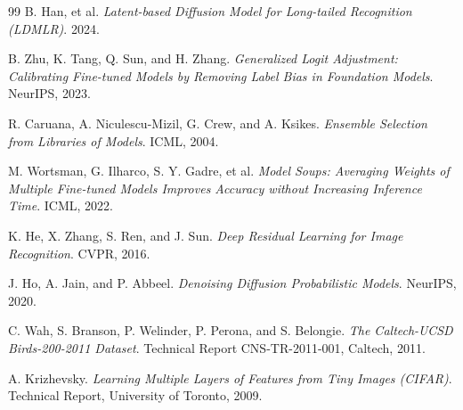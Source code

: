 \begin{thebibliography}{99}
B. Han, et al.
\textit{Latent-based Diffusion Model for Long-tailed Recognition (LDMLR)}.
2024.

B. Zhu, K. Tang, Q. Sun, and H. Zhang.
\textit{Generalized Logit Adjustment: Calibrating Fine-tuned Models by Removing Label Bias in Foundation Models}.
NeurIPS, 2023.

R. Caruana, A. Niculescu-Mizil, G. Crew, and A. Ksikes.
\textit{Ensemble Selection from Libraries of Models}.
ICML, 2004.

M. Wortsman, G. Ilharco, S. Y. Gadre, et al.
\textit{Model Soups: Averaging Weights of Multiple Fine-tuned Models Improves Accuracy without Increasing Inference Time}.
ICML, 2022.

K. He, X. Zhang, S. Ren, and J. Sun.
\textit{Deep Residual Learning for Image Recognition}.
CVPR, 2016.

J. Ho, A. Jain, and P. Abbeel.
\textit{Denoising Diffusion Probabilistic Models}.
NeurIPS, 2020.

C. Wah, S. Branson, P. Welinder, P. Perona, and S. Belongie.
\textit{The Caltech-UCSD Birds-200-2011 Dataset}.
Technical Report CNS-TR-2011-001, Caltech, 2011.

A. Krizhevsky.
\textit{Learning Multiple Layers of Features from Tiny Images (CIFAR)}.
Technical Report, University of Toronto, 2009.

\end{thebibliography}
